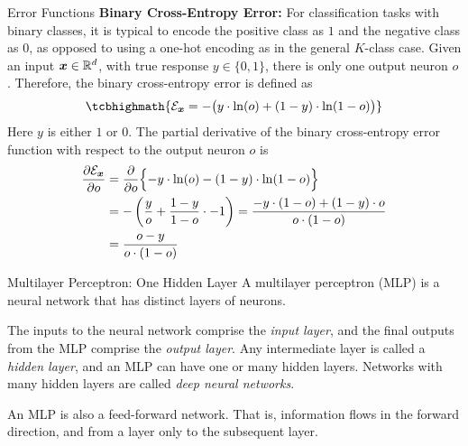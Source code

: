 \begin{frame}{Error Functions}
{\bf Binary Cross-Entropy Error:} For classification tasks with
    binary classes, it is typical to encode the positive class as $1$
    and the negative class as $0$, as opposed to using a one-hot
    encoding as in the general $K$-class case. Given an input ${\boldsymbol x} \in
    {\mathord{\mathbb R}}^d$, with true response $y \in \{0,1\}$, there is only
    one output neuron $o$. Therefore, the binary cross-entropy error is
    defined as
    \begin{align}
        \tcbhighmath{
        \cE_\bx = - \bigl( y \cdot \ln(o) 
            + (1-y) \cdot \ln(1-o) \bigr) 
        }
        \label{eq:reg:neural:CEbinary}
    \end{align}
    Here $y$ is either $1$ or $0$.
The partial derivative of the binary cross-entropy error function with
respect to the output neuron $o$ is
\begin{align}
    \frac{\partial {\mathcal E}_{\boldsymbol x}}{\partial o} & =
    \frac{\partial}{\partial o} \Bigl\{- y\cdot\ln(o) -
    (1-y)\cdot\ln(1-o) \Bigr\} \notag\\
    & = -\left(\frac{y}{o} + \frac{1-y}{1-o} \cdot -1\right)
         = \frac{-y \cdot (1-o) + (1-y)\cdot o} {o\cdot (1-o)} \notag\\
         & = \frac{o-y}{o \cdot (1-o)}
            \label{eq:reg:neural:deriv_CE_binary}
\end{align}


\end{frame}
%
%
\begin{frame}{Multilayer Perceptron: One Hidden Layer}
A multilayer perceptron (MLP) is a neural network that has distinct layers of
neurons. 

\medskip 
The inputs to the neural network comprise the {\em input
layer}, and the final outputs from the MLP comprise the {\em output
layer}. Any intermediate layer is called a {\em hidden layer}, and an MLP
can have one or many hidden layers. Networks with many hidden layers are
called {\em deep neural networks}. 


\medskip 
An MLP is also a feed-forward network. That is, information flows
in the forward direction, and from a layer only to the subsequent layer. 
\end{frame}
